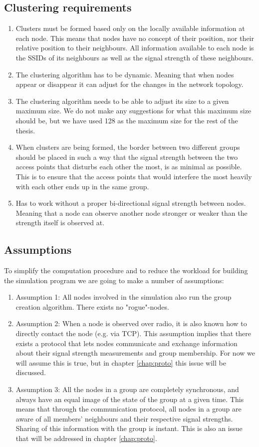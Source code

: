 \subsection{Clustering requirements}\label{chap:requirements}
\begin{enumerate}
	\item Clusters must be formed based only on the locally available information at each node. This means that nodes have no concept of their position, 
		nor their relative position to their neighbours. All information available to each node is the SSIDs of its neighbours as well as the signal strength of these neighbours. 
	\item The clustering algorithm has to be dynamic. Meaning that when nodes appear or disappear it can adjust for the changes in the network topology.
	\item The clustering algorithm needs to be able to adjust its size to a given maximum size. We do not make any suggestions for what this maximum size should be, but
		we have used 128 as the maximum size for the rest of the thesis. 
		\item When clusters are being formed, the border between two different groups should be placed in such a way that the signal strength between the two access points that disturbs each other the most, is as minimal as possible. This is to ensure that the access points that would interfere the most heavily with each other ends up in the same group.
		\item Has to work without a proper bi-directional signal strength between nodes. Meaning that a node can observe another node stronger or weaker than the strength itself is observed at. 
\end{enumerate}

\subsection{Assumptions}\label{chap:assumptions}	
		To simplify the computation procedure and to reduce the workload for building the simulation program we are going to make a number of assumptions:
    \begin{enumerate}
    \item Assumption 1: All nodes involved in the simulation also run the group creation algorithm. There exists no "rogue"-nodes.  
		\item Assumption 2: When a node is observed over radio, it is also known how to directly contact the node (e.g. via TCP). This assumption implies that there exists a protocol that lets nodes communicate and exchange information about their signal strength measurements and group membership. For now we will assume this is true, but in chapter \ref{chap:proto} this issue will be discussed. 
		\item Assumption 3: All the nodes in a group are completely synchronous, and always have an equal image of the state of the group at a given time. This means that through the communication protocol, all nodes in a group are aware of all members' neighbours and their respective signal strengths. Sharing of this information with the group is instant. This is also an issue that will be addressed in chapter \ref{chap:proto}. 
    \end{enumerate}
